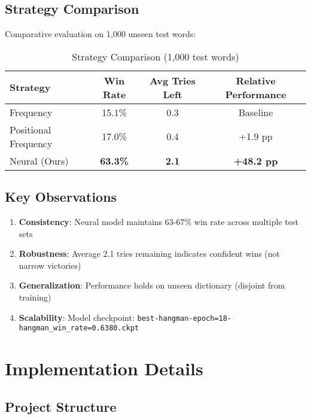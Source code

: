 \documentclass[12pt,a4paper]{article}
\begin{document}
\subsection{Strategy Comparison}

Comparative evaluation on 1,000 unseen test words:

\begin{table}[H]
\centering
\caption{Strategy Comparison (1,000 test words)}
\begin{tabular}{@{}lccc@{}}
\toprule
\textbf{Strategy} & \textbf{Win Rate} & \textbf{Avg Tries Left} & \textbf{Relative Performance} \\
\midrule
Frequency & 15.1\% & 0.3 & Baseline \\
Positional Frequency & 17.0\% & 0.4 & +1.9 pp \\
Neural (Ours) & \textbf{63.3\%} & \textbf{2.1} & \textbf{+48.2 pp} \\
\bottomrule
\end{tabular}
\end{table}

\subsection{Key Observations}

\begin{enumerate}
    \item \textbf{Consistency}: Neural model maintains 63-67\% win rate across multiple test sets
    \item \textbf{Robustness}: Average 2.1 tries remaining indicates confident wins (not narrow victories)
    \item \textbf{Generalization}: Performance holds on unseen dictionary (disjoint from training)
    \item \textbf{Scalability}: Model checkpoint: \texttt{best-hangman-epoch=18-hangman\_win\_rate=0.6380.ckpt}
\end{enumerate}

\section{Implementation Details}

\subsection{Project Structure}
\end{document}

